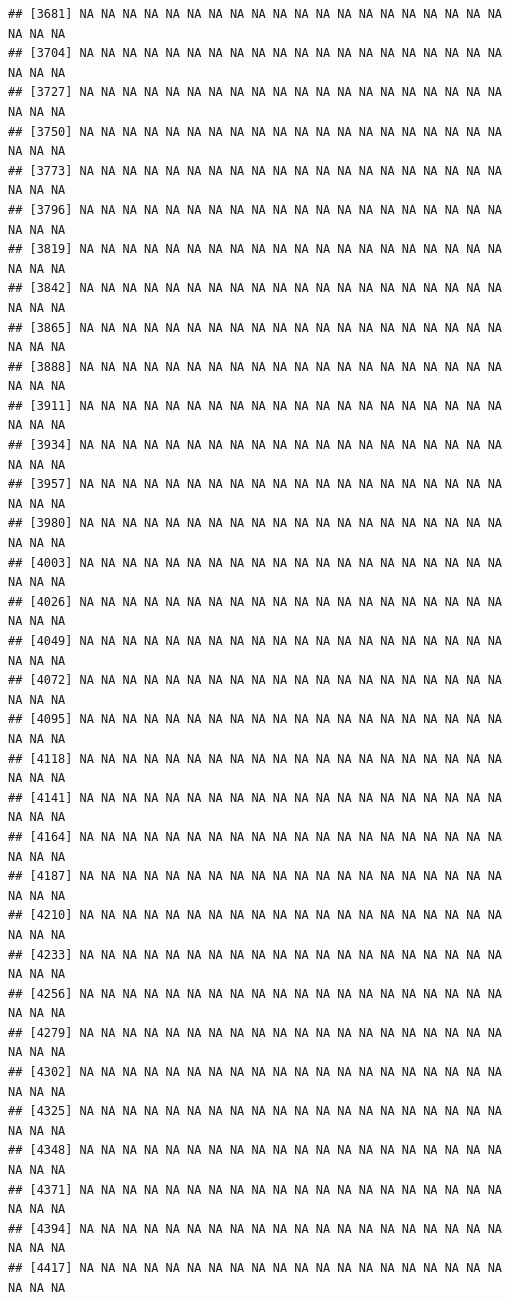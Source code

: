 \documentclass{article}\usepackage[]{graphicx}\usepackage[]{color}
\makeatletter
\newenvironment{kframe}{%
 \def\at@end@of@kframe{}%
 \ifinner\ifhmode%
  \def\at@end@of@kframe{\end{minipage}}%
  \begin{minipage}{\columnwidth}%
 \fi\fi%
 \def\FrameCommand##1{\hskip\@totalleftmargin \hskip-\fboxsep
 \colorbox{shadecolor}{##1}\hskip-\fboxsep
     \hskip-\linewidth \hskip-\@totalleftmargin \hskip\columnwidth}%
 \MakeFramed {\advance\hsize-\width
   \@totalleftmargin\z@ \linewidth\hsize
   \@setminipage}}%
 {\par\unskip\endMakeFramed%
 \at@end@of@kframe}
\newenvironment{knitrout}{}{} %
\makeatother
\begin{document}
\begin{knitrout}
\begin{kframe}
\begin{verbatim}
## [3681] NA NA NA NA NA NA NA NA NA NA NA NA NA NA NA NA NA NA NA NA NA NA NA
## [3704] NA NA NA NA NA NA NA NA NA NA NA NA NA NA NA NA NA NA NA NA NA NA NA
## [3727] NA NA NA NA NA NA NA NA NA NA NA NA NA NA NA NA NA NA NA NA NA NA NA
## [3750] NA NA NA NA NA NA NA NA NA NA NA NA NA NA NA NA NA NA NA NA NA NA NA
## [3773] NA NA NA NA NA NA NA NA NA NA NA NA NA NA NA NA NA NA NA NA NA NA NA
## [3796] NA NA NA NA NA NA NA NA NA NA NA NA NA NA NA NA NA NA NA NA NA NA NA
## [3819] NA NA NA NA NA NA NA NA NA NA NA NA NA NA NA NA NA NA NA NA NA NA NA
## [3842] NA NA NA NA NA NA NA NA NA NA NA NA NA NA NA NA NA NA NA NA NA NA NA
## [3865] NA NA NA NA NA NA NA NA NA NA NA NA NA NA NA NA NA NA NA NA NA NA NA
## [3888] NA NA NA NA NA NA NA NA NA NA NA NA NA NA NA NA NA NA NA NA NA NA NA
## [3911] NA NA NA NA NA NA NA NA NA NA NA NA NA NA NA NA NA NA NA NA NA NA NA
## [3934] NA NA NA NA NA NA NA NA NA NA NA NA NA NA NA NA NA NA NA NA NA NA NA
## [3957] NA NA NA NA NA NA NA NA NA NA NA NA NA NA NA NA NA NA NA NA NA NA NA
## [3980] NA NA NA NA NA NA NA NA NA NA NA NA NA NA NA NA NA NA NA NA NA NA NA
## [4003] NA NA NA NA NA NA NA NA NA NA NA NA NA NA NA NA NA NA NA NA NA NA NA
## [4026] NA NA NA NA NA NA NA NA NA NA NA NA NA NA NA NA NA NA NA NA NA NA NA
## [4049] NA NA NA NA NA NA NA NA NA NA NA NA NA NA NA NA NA NA NA NA NA NA NA
## [4072] NA NA NA NA NA NA NA NA NA NA NA NA NA NA NA NA NA NA NA NA NA NA NA
## [4095] NA NA NA NA NA NA NA NA NA NA NA NA NA NA NA NA NA NA NA NA NA NA NA
## [4118] NA NA NA NA NA NA NA NA NA NA NA NA NA NA NA NA NA NA NA NA NA NA NA
## [4141] NA NA NA NA NA NA NA NA NA NA NA NA NA NA NA NA NA NA NA NA NA NA NA
## [4164] NA NA NA NA NA NA NA NA NA NA NA NA NA NA NA NA NA NA NA NA NA NA NA
## [4187] NA NA NA NA NA NA NA NA NA NA NA NA NA NA NA NA NA NA NA NA NA NA NA
## [4210] NA NA NA NA NA NA NA NA NA NA NA NA NA NA NA NA NA NA NA NA NA NA NA
## [4233] NA NA NA NA NA NA NA NA NA NA NA NA NA NA NA NA NA NA NA NA NA NA NA
## [4256] NA NA NA NA NA NA NA NA NA NA NA NA NA NA NA NA NA NA NA NA NA NA NA
## [4279] NA NA NA NA NA NA NA NA NA NA NA NA NA NA NA NA NA NA NA NA NA NA NA
## [4302] NA NA NA NA NA NA NA NA NA NA NA NA NA NA NA NA NA NA NA NA NA NA NA
## [4325] NA NA NA NA NA NA NA NA NA NA NA NA NA NA NA NA NA NA NA NA NA NA NA
## [4348] NA NA NA NA NA NA NA NA NA NA NA NA NA NA NA NA NA NA NA NA NA NA NA
## [4371] NA NA NA NA NA NA NA NA NA NA NA NA NA NA NA NA NA NA NA NA NA NA NA
## [4394] NA NA NA NA NA NA NA NA NA NA NA NA NA NA NA NA NA NA NA NA NA NA NA
## [4417] NA NA NA NA NA NA NA NA NA NA NA NA NA NA NA NA NA NA NA NA NA NA NA

\end{verbatim}
\end{kframe}
\end{knitrout}
\end{document}
